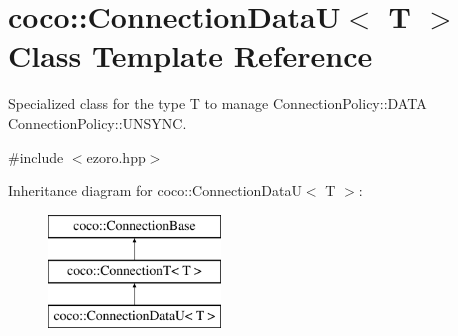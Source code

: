 \hypertarget{classcoco_1_1_connection_data_u}{\section{coco\-:\-:Connection\-Data\-U$<$ T $>$ Class Template Reference}
\label{classcoco_1_1_connection_data_u}
}


Specialized class for the type T to manage Connection\-Policy\-::\-D\-A\-T\-A Connection\-Policy\-::\-U\-N\-S\-Y\-N\-C.  




{\ttfamily \#include $<$ezoro.\-hpp$>$}

Inheritance diagram for coco\-:\-:Connection\-Data\-U$<$ T $>$\-:\begin{figure}[H]
\begin{center}
\leavevmode
\includegraphics[height=3.000000cm]{classcoco_1_1_connection_data_u}
\end{center}
\end{figure}
